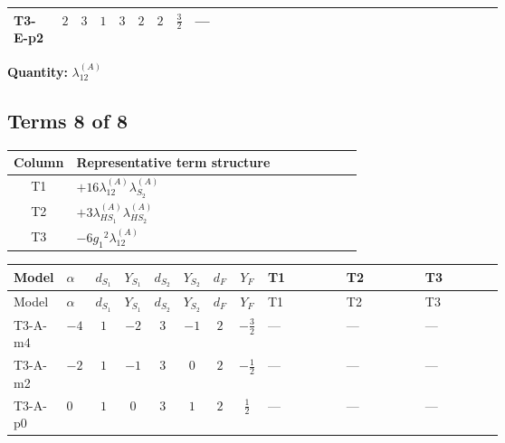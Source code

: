 \documentclass[8pt]{article}
\begin{document}
\begin{landscape}
\begin{longtable}{@{}llcccccc >{\raggedright\arraybackslash}p{0.21\linewidth} >{\raggedright\arraybackslash}p{0.21\linewidth} >{\raggedright\arraybackslash}p{0.21\linewidth}@{}}
\midrule
T3-E-p2 & $2$ & $3$ & $1$ & $3$ & $2$ & $2$ & $\frac{3}{2}$ & --- & \scriptsize\adjustbox{max width=\linewidth}{$\begin{gathered} {\lambda_{12}^{(A)}} \left(2 T_{\nu}^{(1)}+2 T_{\nu}^{(2)}+\frac{16 {\lambda_{12}^{(\times)}}}{3}\right)\end{gathered}$} & \scriptsize\adjustbox{max width=\linewidth}{$\begin{gathered} +16 {\lambda_{12}^{(A)}} {\lambda_{S_1}^{(A)}}\end{gathered}$} \\
\midrule
\bottomrule
\end{longtable}
\clearpage
\noindent\textbf{Quantity: }$\lambda_{12}^{(A)}$\par\smallskip
\subsection*{Terms 8 of 8}
\begin{center}
\begin{tabular}{@{}c >{\raggedright\arraybackslash}p{0.82\linewidth}@{}}
\toprule
Column & Representative term structure \\
\midrule
T1 & \(\displaystyle +16 {\lambda_{12}^{(A)}} {\lambda_{S_2}^{(A)}}\) \\
\midrule
T2 & \(\displaystyle +3 {\lambda_{HS_1}^{(A)}} {\lambda_{HS_2}^{(A)}}\) \\
\midrule
T3 & \(\displaystyle -6 {g_1}^2 {\lambda_{12}^{(A)}}\) \\
\midrule
\bottomrule
\end{tabular}
\end{center}
\smallskip
\tiny
\begin{longtable}{@{}llcccccc >{\raggedright\arraybackslash}p{0.21\linewidth} >{\raggedright\arraybackslash}p{0.21\linewidth} >{\raggedright\arraybackslash}p{0.21\linewidth}@{}}
\toprule
Model & $\alpha$ & $d_{S_1}$ & $Y_{S_1}$ & $d_{S_2}$ & $Y_{S_2}$ & $d_F$ & $Y_F$ & T1 & T2 & T3 \\
\midrule
\endfirsthead
\toprule
Model & $\alpha$ & $d_{S_1}$ & $Y_{S_1}$ & $d_{S_2}$ & $Y_{S_2}$ & $d_F$ & $Y_F$ & T1 & T2 & T3 \\
\midrule
\endhead
T3-A-m4 & $-4$ & $1$ & $-2$ & $3$ & $-1$ & $2$ & $-\frac{3}{2}$ & --- & --- & --- \\
\midrule
T3-A-m2 & $-2$ & $1$ & $-1$ & $3$ & $0$ & $2$ & $-\frac{1}{2}$ & --- & --- & --- \\
\midrule
T3-A-p0 & $0$ & $1$ & $0$ & $3$ & $1$ & $2$ & $\frac{1}{2}$ & --- & --- & --- \\

\end{longtable}
\end{landscape}
\end{document}
